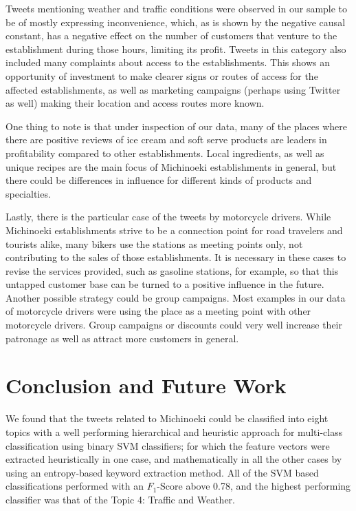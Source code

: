 \documentclass[review]{elsarticle}
\begin{document}
Tweets mentioning weather and traffic conditions were observed in our sample to be of mostly expressing inconvenience, which, as is shown by the negative causal constant, has a negative effect on the number of customers that venture to the establishment during those hours, limiting its profit. Tweets in this category also included many complaints about access to the establishments. This shows an opportunity of investment to make clearer signs or routes of access for the affected establishments, as well as marketing campaigns (perhaps using Twitter as well) making their location and access routes more known.

One thing to note is that under inspection of our data, many of the places where there are positive reviews of ice cream and soft serve products are leaders in profitability compared to other establishments. Local ingredients, as well as unique recipes are the main focus of Michinoeki establishments in general, but there could be differences in influence for different kinds of products and specialties. 

Lastly, there is the particular case of the tweets by motorcycle drivers. While Michinoeki establishments strive to be a connection point for road travelers and tourists alike, many bikers use the stations as meeting points only, not contributing to the sales of those establishments. It is necessary in these cases to revise the services provided, such as gasoline stations, for example, so that this untapped customer base can be turned to a positive influence in the future. Another possible strategy could be group campaigns. Most examples in our data of motorcycle drivers were using the place as a meeting point with other motorcycle drivers. Group campaigns or discounts could very well increase their patronage as well as attract more customers in general.

\section{Conclusion and Future Work}\label{conclusion}

We found that the tweets related to Michinoeki could be classified into eight topics with a well performing hierarchical and heuristic approach for multi-class classification using binary SVM classifiers; for which the feature vectors were extracted heuristically in one case, and mathematically in all the other cases by using an entropy-based keyword extraction method. All of the SVM based classifications performed with an \(F_1\)-Score above 0.78, and the highest performing classifier was that of the Topic 4: Traffic and Weather. 
\end{document}
